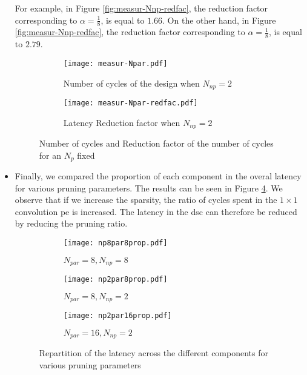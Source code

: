 \begin{itemize}
    For example, in Figure \ref{fig:measur-Nnp-redfac}, the reduction factor corresponding to $\alpha = \frac{1}{8}$, is equal to $1.66$. On the other hand,
    in Figure \ref{fig:measur-Nnp-redfac}, the reduction factor corresponding to $\alpha = \frac{1}{8}$, is equal to $2.79$.
    \begin{figure}
        \centering
        \begin{subfigure}[t]{.49\textwidth}
            \centering
            \texttt{[image: measur-Npar.pdf]}
            \caption{Number of cycles of the design when $N_{np} = 2$}
            \label{fig:measur-Npar}
        \end{subfigure}
        \begin{subfigure}[t]{.49\textwidth}
            \centering
            \texttt{[image: measur-Npar-redfac.pdf]}
            \caption{Latency Reduction factor when $N_{np} = 2$}
            \label{fig:measur-Npar-redfac}
        \end{subfigure}
        \caption{Number of cycles and Reduction factor of the number of cycles for an $N_{p}$ fixed}
    \end{figure}
    \item Finally, we compared the proportion of each component in the overal latency for various pruning parameters. The results can be seen in Figure \ref{fig:ratio-pr}. We observe that if we increase the sparsity, the ratio of cycles spent in the $1 \times 1$ convolution \acrshort{pe} is increased. The latency in the \acrshort{dsc} can therefore be reduced by reducing the pruning ratio.
    \begin{figure}
        \centering
        \begin{subfigure}[t]{.32\textwidth}
            \centering
            \texttt{[image: np8par8prop.pdf]}
            \caption{$N_{par} = 8, N_{np} = 8$}
        \end{subfigure}
        \begin{subfigure}[t]{.32\textwidth}
            \centering
            \texttt{[image: np2par8prop.pdf]}
            \caption{$N_{par} = 8, N_{np} = 2$}
        \end{subfigure}
        \begin{subfigure}[t]{.32\textwidth}
            \centering
            \texttt{[image: np2par16prop.pdf]}
            \caption{$N_{par} = 16, N_{np} = 2$}
        \end{subfigure}
        \caption{Repartition of the latency across the different components for various pruning parameters}
        \label{fig:ratio-pr}
    \end{figure}
\end{itemize}
%
